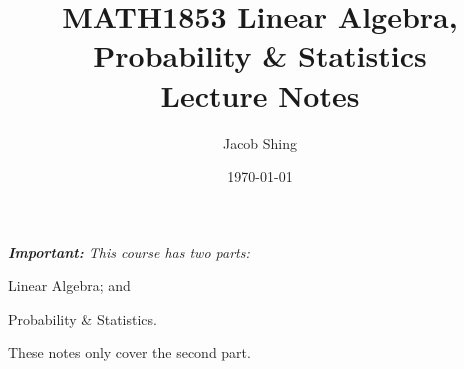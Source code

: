 \documentclass{article}
\title{\bfseries MATH1853 Linear Algebra, Probability \& Statistics \\ \Large Lecture Notes}
\author{Jacob Shing}
\date{\today}
\begin{document}
\maketitle

{
    \itshape
\textbf{Important: }
This course has two parts: \begin{enumerate*}[label=(\arabic*)]
    \item Linear Algebra; and
    \item Probability \& Statistics.
\end{enumerate*}
These notes only cover the second part.
}


\end{document}
